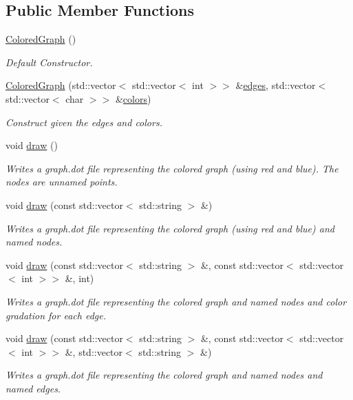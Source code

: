 \subsection*{Public Member Functions}
\begin{DoxyCompactItemize}
\item 
\hyperlink{classMackey_1_1ColoredGraph_a367055b4a615119cc767a738f6e9e719}{Colored\+Graph} ()
\begin{DoxyCompactList}\small\item\em Default Constructor. \end{DoxyCompactList}\item 
\hyperlink{classMackey_1_1ColoredGraph_adada856cdbfc508b2df15919f45a1808}{Colored\+Graph} (std\+::vector$<$ std\+::vector$<$ int $>$$>$ \&\hyperlink{classMackey_1_1Graph_a729ec24b9f9e504f4c4e2d3f6e2cab83}{edges}, std\+::vector$<$ std\+::vector$<$ char $>$$>$ \&\hyperlink{classMackey_1_1ColoredGraph_a29fbdcaf9f94f0f5d48e5390ba49b338}{colors})
\begin{DoxyCompactList}\small\item\em Construct given the edges and colors. \end{DoxyCompactList}\item 
void \hyperlink{classMackey_1_1ColoredGraph_a8ed05073805b34a0087a7ed94e889694}{draw} ()
\begin{DoxyCompactList}\small\item\em Writes a graph.\+dot file representing the colored graph (using red and blue). The nodes are unnamed points. \end{DoxyCompactList}\item 
void \hyperlink{classMackey_1_1ColoredGraph_a912a6e5cb94386d9ff6510e968b41e7d}{draw} (const std\+::vector$<$ std\+::string $>$ \&)
\begin{DoxyCompactList}\small\item\em Writes a graph.\+dot file representing the colored graph (using red and blue) and named nodes. \end{DoxyCompactList}\item 
void \hyperlink{classMackey_1_1ColoredGraph_a5368f26080615293e8c43657f61f9100}{draw} (const std\+::vector$<$ std\+::string $>$ \&, const std\+::vector$<$ std\+::vector$<$ int $>$$>$ \&, int)
\begin{DoxyCompactList}\small\item\em Writes a graph.\+dot file representing the colored graph and named nodes and color gradation for each edge. \end{DoxyCompactList}\item 
void \hyperlink{classMackey_1_1ColoredGraph_a88cde9e3cc3bfb72409142ac6705b474}{draw} (const std\+::vector$<$ std\+::string $>$ \&, const std\+::vector$<$ std\+::vector$<$ int $>$$>$ \&, std\+::vector$<$ std\+::string $>$ \&)
\begin{DoxyCompactList}\small\item\em Writes a graph.\+dot file representing the colored graph and named nodes and named edges. \end{DoxyCompactList}\end{DoxyCompactItemize}

